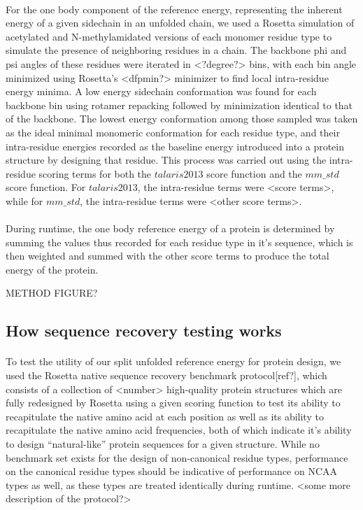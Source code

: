 \paragraph{}
For the one body component of the reference energy, representing the inherent energy of a given sidechain in an unfolded chain, we used a Rosetta simulation of acetylated and N-methylamidated versions of each monomer residue type to simulate the presence of neighboring residues in a chain. The backbone phi and psi angles of these residues were iterated in <?degree?> bins, with each bin angle minimized using Rosetta's <dfpmin?> minimizer to find local intra-residue energy minima. A low energy sidechain conformation was found for each backbone bin using rotamer repacking followed by minimization identical to that of the backbone. The lowest energy conformation among those sampled was taken as the ideal minimal monomeric conformation for each residue type, and their intra-residue energies recorded as the baseline energy introduced into a protein structure by designing that residue. This process was carried out using the intra-residue scoring terms for both the $talaris2013$ score function and the $mm\_std$ score function. For $talaris2013$, the intra-residue terms were <score terms>, while for $mm\_std$, the intra-residue terms were <other score terms>.

\paragraph{}
During runtime, the one body reference energy of a protein is determined by summing the values thus recorded for each residue type in it's sequence, which is then weighted and summed with the other score terms to produce the total energy of the protein.

METHOD FIGURE?


\subsection{How sequence recovery testing works}
\paragraph{}
To test the utility of our split unfolded reference energy for protein design, we used the Rosetta native sequence recovery benchmark protocol[ref?], which consists of a collection of <number> high-quality protein structures which are fully redesigned by Rosetta using a given scoring function to test its ability to recapitulate the native amino acid at each position as well as its ability to recapitulate the native amino acid frequencies, both of which indicate it's ability to design ``natural-like'' protein sequences for a given structure. While no benchmark set exists for the design of non-canonical residue types, performance on the canonical residue types should be indicative of performance on NCAA types as well, as these types are treated identically during runtime. <some more description of the protocol?>

